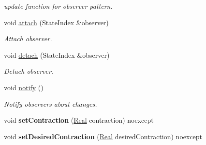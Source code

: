 \begin{DoxyCompactItemize}
\begin{DoxyCompactList}\small\item\em update function for observer pattern. \end{DoxyCompactList}\item 
\hypertarget{classSpacy_1_1Mixin_1_1MixinConnection_abb5520ee6b22dd993d78f142939a1ed4}{}void \hyperlink{classSpacy_1_1Mixin_1_1MixinConnection_abb5520ee6b22dd993d78f142939a1ed4}{attach} (State\+Index \&observer)\label{classSpacy_1_1Mixin_1_1MixinConnection_abb5520ee6b22dd993d78f142939a1ed4}

\begin{DoxyCompactList}\small\item\em Attach observer. \end{DoxyCompactList}\item 
\hypertarget{classSpacy_1_1Mixin_1_1MixinConnection_adda739590c487679c26f60e50aedb73f}{}void \hyperlink{classSpacy_1_1Mixin_1_1MixinConnection_adda739590c487679c26f60e50aedb73f}{detach} (State\+Index \&observer)\label{classSpacy_1_1Mixin_1_1MixinConnection_adda739590c487679c26f60e50aedb73f}

\begin{DoxyCompactList}\small\item\em Detach observer. \end{DoxyCompactList}\item 
\hypertarget{classSpacy_1_1Mixin_1_1MixinConnection_a1ddeaa78a3bb4a38c2cca36d1f99fe36}{}void \hyperlink{classSpacy_1_1Mixin_1_1MixinConnection_a1ddeaa78a3bb4a38c2cca36d1f99fe36}{notify} ()\label{classSpacy_1_1Mixin_1_1MixinConnection_a1ddeaa78a3bb4a38c2cca36d1f99fe36}

\begin{DoxyCompactList}\small\item\em Notify observers about changes. \end{DoxyCompactList}\item 
\hypertarget{classSpacy_1_1Mixin_1_1ContractionRate_ab9215981f0454bd5d641abad582e64e5}{}void {\bfseries set\+Contraction} (\hyperlink{classSpacy_1_1Real}{Real} contraction) noexcept\label{classSpacy_1_1Mixin_1_1ContractionRate_ab9215981f0454bd5d641abad582e64e5}

\item 
\hypertarget{classSpacy_1_1Mixin_1_1ContractionRate_a26eaa6344b5b2191931a9fd87ed96f39}{}void {\bfseries set\+Desired\+Contraction} (\hyperlink{classSpacy_1_1Real}{Real} desired\+Contraction) noexcept\label{classSpacy_1_1Mixin_1_1ContractionRate_a26eaa6344b5b2191931a9fd87ed96f39}


\end{DoxyCompactItemize}
